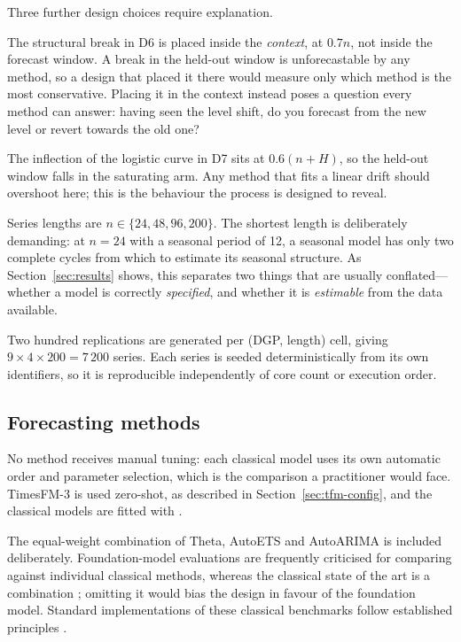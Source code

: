 \documentclass[article]{ajs}
\providecommand{\sectionref}[1]{Section~\ref{#1}}
\begin{document}
Three further design choices require explanation.

The structural break in D6 is placed inside the \emph{context}, at $0.7n$, not inside the
forecast window. A break in the held-out window is unforecastable by any method, so a design
that placed it there would measure only which method is the most conservative. Placing it in
the context instead poses a question every method can answer: having seen the level shift, do
you forecast from the new level or revert towards the old one?

The inflection of the logistic curve in D7 sits at $0.6(n+H)$, so the held-out window falls in
the saturating arm. Any method that fits a linear drift should overshoot here; this is the
behaviour the process is designed to reveal.

Series lengths are $n \in \{24, 48, 96, 200\}$. The shortest length is deliberately demanding: at
$n=24$ with a seasonal period of 12, a seasonal model has only two complete cycles from which
to estimate its seasonal structure. As \sectionref{sec:results} shows, this separates two
things that are usually conflated---whether a model is correctly \emph{specified}, and whether
it is \emph{estimable} from the data available.

Two hundred replications are generated per (DGP, length) cell, giving
$9 \times 4 \times 200 = 7\,200$ series. Each series is seeded deterministically from its own
identifiers, so it is reproducible independently of core count or execution order.

\subsection{Forecasting methods}
\label{sec:methods}

No method receives manual tuning: each classical model uses its own automatic order and
parameter selection, which is the comparison a practitioner would face. TimesFM-3 is used
zero-shot, as described in \sectionref{sec:tfm-config}, and the classical models are fitted with
 \citep{statsforecast}.

The equal-weight combination of Theta, AutoETS and AutoARIMA is included deliberately.
Foundation-model evaluations are frequently criticised for comparing against individual classical
methods, whereas the classical state of the art is a combination \citep{makridakis2020m4, petropoulos2022theory};
omitting it would bias the design in favour of the foundation model. Standard implementations of these
classical benchmarks follow established principles \citep{hyndman2021fpp}.
\end{document}
